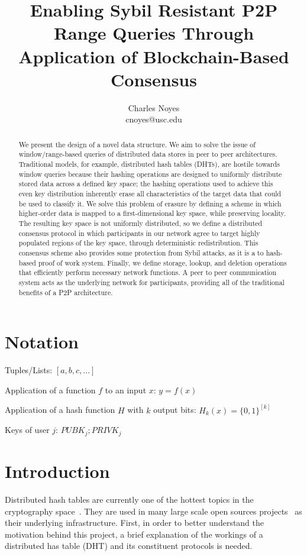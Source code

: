 \documentclass[10pt]{IEEEtran}
\title{Enabling Sybil Resistant P2P Range Queries Through Application of Blockchain-Based Consensus}
\author{Charles Noyes \\ cnoyes@usc.edu}
\date{\vspace{-5ex}}
\begin{document}
\maketitle

\begin{abstract}
We present the design of a novel data structure. We aim to solve the issue of window/range-based queries of distributed data stores in peer to peer architectures. Traditional models, for example, distributed hash tables (DHTs), are hostile towards window queries because their hashing operations are designed to uniformly distribute stored data across a defined key space; the hashing operations used to achieve this even key distribution inherently erase all characteristics of the target data that could be used to classify it. We solve this problem of erasure by defining a scheme in which higher-order data is mapped to a first-dimensional key space, while preserving locality. The resulting key space is not uniformly distributed, so we define a distributed consensus protocol in which participants in our network agree to target highly populated regions of the key space, through deterministic redistribution. This consensus scheme also provides some protection from Sybil attacks, as it is a to hash-based proof of work system. Finally, we define storage, lookup, and deletion operations that efficiently perform necessary network functions. A peer to peer communication system acts as the underlying network for participants, providing all of the traditional benefits of a P2P architecture.
\end{abstract}


\section{Notation}

\noindent Tuples/Lists: $[a,b,c,...]$

\noindent Application of a function $f$ to an input $x$: $y=f(x)$

\noindent Application of a hash function $H$ with $k$ output bits: $H_{k}(x) = \{0,1\}^{[k]}$

\noindent Keys of user $j$: $ PUBK_j; PRIVK_j $

 
\section{Introduction}
\par Distributed hash tables are currently one of the hottest topics in the cryptography space~\cite{Stoica:2001dj,Rowstron:2001ea,Ratnasamy:2001wn}. They are used in many large scale open sources projects~\cite{Freitas:2013tb,Xu:2010vs,Perfitt:2010fh} as their underlying infrastructure. First, in order to better understand the motivation behind this project, a brief explanation of the workings of a distributed has table (DHT) and its constituent protocols is needed.
\end{document}
